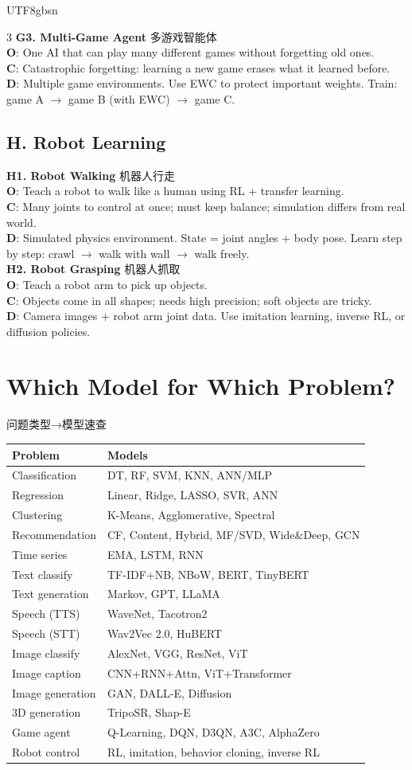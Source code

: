 \documentclass[9pt,landscape,a4paper]{article}
\newcommand{\zhint}[1]{{\scriptsize\color{gray!70!black}#1}}
\newcommand{\scenario}[5]{%
\textbf{#1} \zhint{#2}\\
\textbf{O}: #3\\
\textbf{C}: #4\\
\textbf{D}: #5\\[-3pt]
}
\begin{document}
\begin{CJK}{UTF8}{gbsn}
\begin{multicols}{3}
\scenario{G3. Multi-Game Agent}{多游戏智能体}
{One AI that can play many different games without forgetting old ones.}
{Catastrophic forgetting: learning a new game erases what it learned before.}
{Multiple game environments. Use EWC to protect important weights. Train: game A $\to$ game B (with EWC) $\to$ game C.}

\subsection{H. Robot Learning}

\scenario{H1. Robot Walking}{机器人行走}
{Teach a robot to walk like a human using RL + transfer learning.}
{Many joints to control at once; must keep balance; simulation differs from real world.}
{Simulated physics environment. State = joint angles + body pose. Learn step by step: crawl $\to$ walk with wall $\to$ walk freely.}

\scenario{H2. Robot Grasping}{机器人抓取}
{Teach a robot arm to pick up objects.}
{Objects come in all shapes; needs high precision; soft objects are tricky.}
{Camera images + robot arm joint data. Use imitation learning, inverse RL, or diffusion policies.}

\section{Which Model for Which Problem?}
\zhint{问题类型→模型速查}

\begin{tabular}{@{}p{2.8cm}p{4.5cm}@{}}
\textbf{Problem} & \textbf{Models} \\
\hline
Classification & DT, RF, SVM, KNN, ANN/MLP \\
Regression & Linear, Ridge, LASSO, SVR, ANN \\
Clustering & K-Means, Agglomerative, Spectral \\
Recommendation & CF, Content, Hybrid, MF/SVD, Wide\&Deep, GCN \\
Time series & EMA, LSTM, RNN \\
Text classify & TF-IDF+NB, NBoW, BERT, TinyBERT \\
Text generation & Markov, GPT, LLaMA \\
Speech (TTS) & WaveNet, Tacotron2 \\
Speech (STT) & Wav2Vec 2.0, HuBERT \\
Image classify & AlexNet, VGG, ResNet, ViT \\
Image caption & CNN+RNN+Attn, ViT+Transformer \\
Image generation & GAN, DALL-E, Diffusion \\
3D generation & TripoSR, Shap-E \\
Game agent & Q-Learning, DQN, D3QN, A3C, AlphaZero \\
Robot control & RL, imitation, behavior cloning, inverse RL \\
\end{tabular}

\end{multicols}
\end{CJK}
\end{document}
